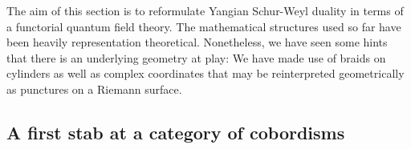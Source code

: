 \documentclass[11pt]{report}
\theoremstyle{definition}
\newtheorem{definition}[theorem]{Definition}
\theoremstyle{remark}
\theoremstyle{remark}
\renewcommand{\P}{\mathbb{P}}
\begin{document}
The aim of this section is to reformulate Yangian Schur-Weyl duality in terms of a functorial quantum field theory. The mathematical structures used so far have been heavily representation theoretical. Nonetheless, we have seen some hints that there is an underlying geometry at play: We have made use of braids on cylinders as well as complex coordinates that may be reinterpreted geometrically as punctures on a Riemann surface.

\subsection{A first stab at a category of cobordisms}

%
%
%
\end{document}
